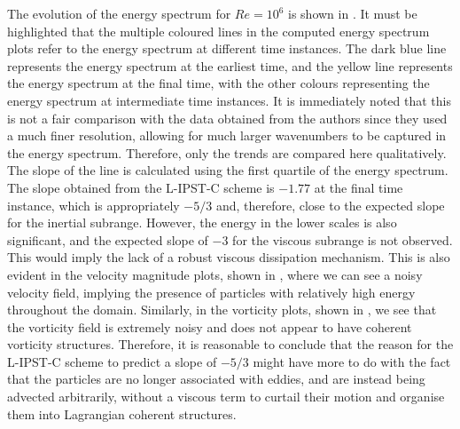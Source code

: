 The evolution of the energy spectrum for $Re=10^6$ is shown in . It must be highlighted that the multiple coloured lines in the computed energy spectrum plots refer to the energy spectrum at different time instances. The dark blue line represents the energy spectrum at the earliest time, and the yellow line represents the energy spectrum at the final time, with the other colours representing the energy spectrum at intermediate time instances.
It is immediately noted that this is not a fair comparison with the data obtained from the authors since they used a much finer resolution, allowing for much larger wavenumbers to be captured in the energy spectrum.
Therefore, only the trends are compared here qualitatively. The slope of the line is calculated using the first quartile of the energy spectrum. The slope obtained from the L-IPST-C scheme is $-1.77$ at the final time instance, which is appropriately $-5/3$ and, therefore, close to the expected slope for the inertial subrange.
However, the energy in the lower scales is also significant, and the expected slope of $-3$ for the viscous subrange is not observed.
This would imply the lack of a robust viscous dissipation mechanism. This is also evident in the velocity magnitude plots, shown in , where we can see a noisy velocity field, implying the presence of particles with relatively high energy throughout the domain. Similarly, in the vorticity plots, shown in , we see that the vorticity field is extremely noisy and does not appear to have coherent vorticity structures.
Therefore, it is reasonable to conclude that the reason for the L-IPST-C scheme to predict a slope of $-5/3$ might have more to do with the fact that the particles are no longer associated with eddies, and are instead being advected arbitrarily, without a viscous term to curtail their motion and organise them into Lagrangian coherent structures.

